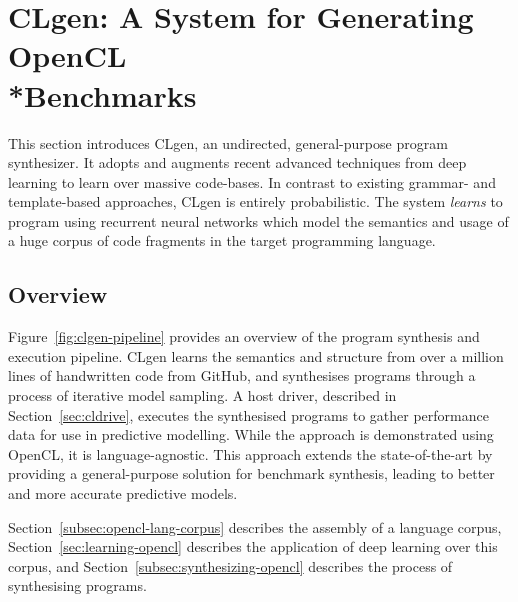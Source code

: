 \section[CLgen: A System for Generating OpenCL Benchmarks]{CLgen: A System for Generating OpenCL\\*Benchmarks}%
\label{sec:clgen}

This section introduces CLgen, an undirected, general-purpose program synthesizer. It adopts and augments recent advanced techniques from deep learning to learn over massive code-bases. In contrast to existing grammar- and template-based approaches, CLgen is entirely probabilistic. The system \emph{learns} to program using recurrent neural networks which model the semantics and usage of a huge corpus of code fragments in the target programming language.

\subsection{Overview}

Figure~\ref{fig:clgen-pipeline} provides an overview of the program synthesis and execution pipeline. CLgen learns the semantics and structure from over a million lines of handwritten code from GitHub, and synthesises programs through a process of iterative model sampling. A host driver, described in Section~\ref{sec:cldrive}, executes the synthesised programs to gather performance data for use in predictive modelling. While the approach is demonstrated using OpenCL, it is language-agnostic. This approach extends the state-of-the-art by providing a general-purpose solution for benchmark synthesis, leading to better and more accurate predictive models.

Section~\ref{subsec:opencl-lang-corpus} describes the assembly of a language corpus, Section~\ref{sec:learning-opencl} describes the application of deep learning over this corpus, and Section~\ref{subsec:synthesizing-opencl} describes the process of synthesising programs.

